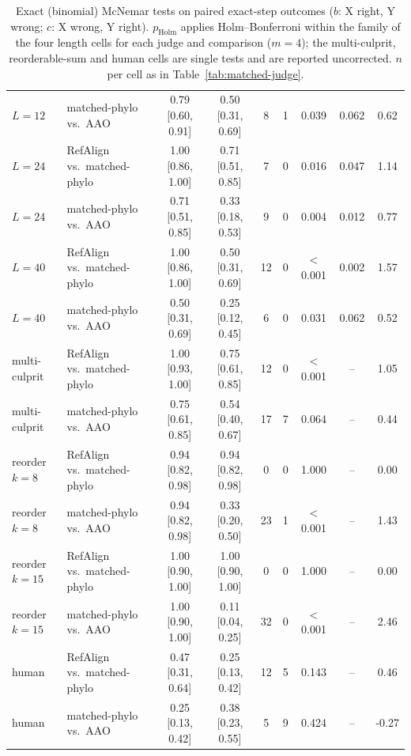 \begin{table}[t]
\begin{tabular}{llccccccc}
$L{=}12$ & matched-phylo vs.\ AAO & 0.79 [0.60, 0.91] & 0.50 [0.31, 0.69] & 8 & 1 & 0.039 & 0.062 & 0.62 \\
$L{=}24$ & RefAlign vs.\ matched-phylo & 1.00 [0.86, 1.00] & 0.71 [0.51, 0.85] & 7 & 0 & 0.016 & 0.047 & 1.14 \\
$L{=}24$ & matched-phylo vs.\ AAO & 0.71 [0.51, 0.85] & 0.33 [0.18, 0.53] & 9 & 0 & 0.004 & 0.012 & 0.77 \\
$L{=}40$ & RefAlign vs.\ matched-phylo & 1.00 [0.86, 1.00] & 0.50 [0.31, 0.69] & 12 & 0 & $<$0.001 & 0.002 & 1.57 \\
$L{=}40$ & matched-phylo vs.\ AAO & 0.50 [0.31, 0.69] & 0.25 [0.12, 0.45] & 6 & 0 & 0.031 & 0.062 & 0.52 \\
multi-culprit & RefAlign vs.\ matched-phylo & 1.00 [0.93, 1.00] & 0.75 [0.61, 0.85] & 12 & 0 & $<$0.001 & -- & 1.05 \\
multi-culprit & matched-phylo vs.\ AAO & 0.75 [0.61, 0.85] & 0.54 [0.40, 0.67] & 17 & 7 & 0.064 & -- & 0.44 \\
reorder $k{=}8$ & RefAlign vs.\ matched-phylo & 0.94 [0.82, 0.98] & 0.94 [0.82, 0.98] & 0 & 0 & 1.000 & -- & 0.00 \\
reorder $k{=}8$ & matched-phylo vs.\ AAO & 0.94 [0.82, 0.98] & 0.33 [0.20, 0.50] & 23 & 1 & $<$0.001 & -- & 1.43 \\
reorder $k{=}15$ & RefAlign vs.\ matched-phylo & 1.00 [0.90, 1.00] & 1.00 [0.90, 1.00] & 0 & 0 & 1.000 & -- & 0.00 \\
reorder $k{=}15$ & matched-phylo vs.\ AAO & 1.00 [0.90, 1.00] & 0.11 [0.04, 0.25] & 32 & 0 & $<$0.001 & -- & 2.46 \\
human & RefAlign vs.\ matched-phylo & 0.47 [0.31, 0.64] & 0.25 [0.13, 0.42] & 12 & 5 & 0.143 & -- & 0.46 \\
human & matched-phylo vs.\ AAO & 0.25 [0.13, 0.42] & 0.38 [0.23, 0.55] & 5 & 9 & 0.424 & -- & -0.27 \\
\bottomrule
\end{tabular}
\caption{Exact (binomial) McNemar tests on paired exact-step outcomes ($b$: X right, Y wrong; $c$: X wrong, Y right). $p_{\mathrm{Holm}}$ applies Holm--Bonferroni within the family of the four length cells for each judge and comparison ($m{=}4$); the multi-culprit, reorderable-sum and human cells are single tests and are reported uncorrected. $n$ per cell as in Table~\ref{tab:matched-judge}.}
\label{tab:matched-judge-tests}
\end{table}
